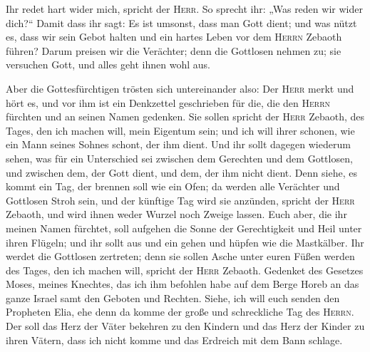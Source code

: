  Ihr redet hart wider mich, spricht der \textsc{Herr}. So
sprecht ihr: „Was reden wir wider dich?{}``  Damit dass
ihr sagt: Es ist umsonst, dass man Gott dient; und was nützt es, dass
wir sein Gebot halten und ein hartes Leben vor dem \textsc{Herrn}
Zebaoth führen?  Darum preisen wir die Verächter; denn
die Gottlosen nehmen zu; sie versuchen Gott, und alles geht ihnen wohl
aus.

 Aber die Gottesfürchtigen trösten sich untereinander
also: Der \textsc{Herr} merkt und hört es, und vor ihm ist ein
Denkzettel geschrieben für die, die den \textsc{Herrn} fürchten und an
seinen Namen gedenken.  Sie sollen spricht der
\textsc{Herr} Zebaoth, des Tages, den ich machen will, mein Eigentum
sein; und ich will ihrer schonen, wie ein Mann seines Sohnes schont, der
ihm dient.  Und ihr sollt dagegen wiederum sehen, was für
ein Unterschied sei zwischen dem Gerechten und dem Gottlosen, und
zwischen dem, der Gott dient, und dem, der ihm nicht dient.
 Denn siehe, es kommt ein Tag, der brennen soll wie ein
Ofen; da werden alle Verächter und Gottlosen Stroh sein, und der
künftige Tag wird sie anzünden, spricht der \textsc{Herr} Zebaoth, und
wird ihnen weder Wurzel noch Zweige lassen.  Euch aber,
die ihr meinen Namen fürchtet, soll aufgehen die Sonne der Gerechtigkeit
und Heil unter ihren Flügeln; und ihr sollt aus und ein gehen und hüpfen
wie die Mastkälber.  Ihr werdet die Gottlosen zertreten;
denn sie sollen Asche unter euren Füßen werden des Tages, den ich machen
will, spricht der \textsc{Herr} Zebaoth.  Gedenket des
Gesetzes Moses, meines Knechtes, das ich ihm befohlen habe auf dem Berge
Horeb an das ganze Israel samt den Geboten und Rechten. 
Siehe, ich will euch senden den Propheten Elia, ehe denn da komme der
große und schreckliche Tag des \textsc{Herrn}.  Der soll
das Herz der Väter bekehren zu den Kindern und das Herz der Kinder zu
ihren Vätern, dass ich nicht komme und das Erdreich mit dem Bann
schlage.
